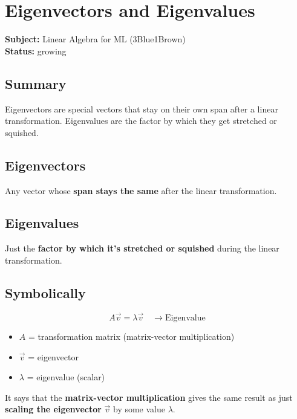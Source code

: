 \section{Eigenvectors and Eigenvalues}
\label{sec:eigen}

\noindent\textbf{Subject:} Linear Algebra for ML (3Blue1Brown) \\
\textbf{Status:} growing

\subsection*{Summary}
Eigenvectors are special vectors that stay on their own span after a linear transformation. Eigenvalues are the factor by which they get stretched or squished.

\subsection{Eigenvectors}
\begin{defbox}
Any vector whose \textbf{span stays the same} after the linear transformation.
\end{defbox}

\subsection{Eigenvalues}
\begin{defbox}
Just the \textbf{factor by which it's stretched or squished} during the linear transformation.
\end{defbox}

\subsection{Symbolically}

\[
A\vec{v} = \lambda\vec{v} \quad \rightarrow \text{Eigenvalue}
\]

\begin{itemize}[nosep]
  \item $A$ = transformation matrix (matrix-vector multiplication)
  \item $\vec{v}$ = eigenvector
  \item $\lambda$ = eigenvalue (scalar)
\end{itemize}

\begin{notebox}
It says that the \textbf{matrix-vector multiplication} gives the same result as just \textbf{scaling the eigenvector} $\vec{v}$ by some value $\lambda$.
\end{notebox}

